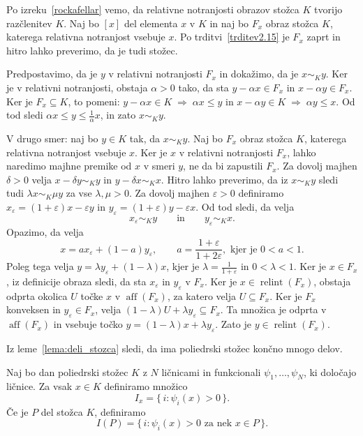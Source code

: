 \documentclass[mat2, tisk]{fmfdelo}
\begin{document}
\begin{dokaz}
Po izreku~\ref{rockafellar} vemo, da relativne notranjosti obrazov stožca $K$ tvorijo razčlenitev $K$. 
Naj bo $[x]$ del elementa $x$ v $K$ in naj bo $F_x$ obraz stožca $K$, katerega relativna notranjost vsebuje $x$. 
Po trditvi~\ref{trditev2.15} je $F_x$ zaprt in hitro lahko preverimo, da je tudi stožec.

Predpostavimo, da je $y$ v relativni notranjosti $F_x$ in dokažimo, da je $x \sim_K y$. 
Ker je v relativni notranjosti, obstaja $\alpha > 0$ tako, da sta 
$y - \alpha x \in F_x$ in $x - \alpha y \in F_x$. 
Ker je \( F_x \subseteq K \), to pomeni:
$y - \alpha x \in K \;\Rightarrow\; \alpha x \le y$
in
$x - \alpha y \in K \;\Rightarrow\; \alpha y \le x$.
Od tod sledi $\alpha x \leq y \leq \frac{1}{\alpha} x$, in zato $x \sim_K y$.

V drugo smer: naj bo $y \in K$ tak, da $x \sim_K y$.
Naj bo $F_x$ obraz stožca $K$, katerega relativna notranjost vsebuje $x$. Ker je $x$ v relativni notranjosti $F_x$, lahko naredimo majhne 
premike od $x$ v smeri $y$, ne da bi zapustili $F_x$.
Za dovolj majhen $\delta > 0$ velja $x - \delta y \sim_K y$ in $y - \delta x \sim_K x$. 
Hitro lahko preverimo, da iz $x \sim_K y$ sledi tudi $\lambda x \sim_K \mu y$ za vse $\lambda, \mu > 0$.  
Za dovolj majhen $\varepsilon > 0$ definiramo $x_\varepsilon = (1+\varepsilon)x - \varepsilon y$ in $y_\varepsilon = (1+\varepsilon)y - \varepsilon x$.
Od tod sledi, da velja
\[
x_\varepsilon \sim_K y
\qquad\text{in}\qquad
y_\varepsilon \sim_K x.
\]
Opazimo, da velja
\[
x = a x_\varepsilon + (1-a) y_\varepsilon,
\qquad
a = \frac{1+\varepsilon}{1+2\varepsilon}, \text{ kjer je } 0 < a < 1.
\]
Poleg tega velja
$y=\lambda y_\varepsilon+(1-\lambda)x$, kjer je
$\lambda=\frac{1}{1+\varepsilon}$ in $0<\lambda<1$.
Ker je $x \in F_x$, iz definicije obraza sledi, da sta $x_\varepsilon$ in $y_\varepsilon$ v $F_x$.
Ker je $x\in\operatorname{relint}(F_x)$, obstaja
odprta okolica $U$ točke $x$ v $\operatorname{aff}(F_x)$,
za katero velja $U\subseteq F_x$.
Ker je $F_x$ konveksen in $y_\varepsilon\in F_x$,
velja $(1-\lambda)U+\lambda y_\varepsilon\subseteq F_x$.
Ta množica je odprta v $\operatorname{aff}(F_x)$
in vsebuje točko
$y=(1-\lambda)x+\lambda y_\varepsilon$.
Zato je $y\in\operatorname{relint}(F_x)$.
\end{dokaz}

Iz leme~\ref{lema:deli_stozca} sledi, da ima poliedrski stožec končno mnogo delov. 
\begin{definicija}
  Naj bo dan poliedrski stožec \(K\) z \(N\) ličnicami in funkcionali
  \(\psi_1,\ldots,\psi_N\), ki določajo ličnice. Za vsak \(x\in K\) definiramo množico
  \[
  I_x=\{\, i : \psi_i(x)>0 \,\}.
  \]
  Če je \(P\) del stožca \(K\), definiramo
  \[
  I(P)=\{\, i : \psi_i(x)>0 \text{ za nek } x\in P \,\}.
  \]
\end{definicija}
\end{document}

